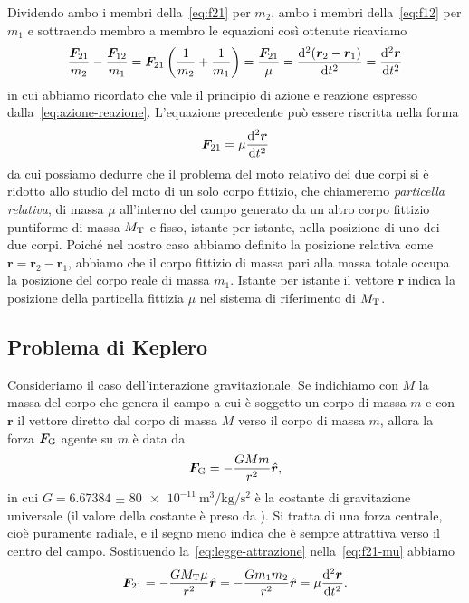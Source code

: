 Dividendo ambo i membri della~\eqref{eq:f21} per $m_2$, ambo i membri
della~\eqref{eq:f12} per $m_1$ e sottraendo membro a membro le equazioni così
ottenute ricaviamo
\begin{equation}
  \frac{\bm{F}_{21}}{m_2}-\frac{\bm{F}_{12}}{m_1} = \bm{F}_{21}
  \left(
    \frac{1}{m_2}+\frac{1}{m_1}
  \right) = \frac{\bm{F}_{21}}{\mu} = \toder[2]{(\bm{r}_2-\bm{r}_1)}{t} =
  \toder[2]{\bm{r}}{t}
\end{equation}
in cui abbiamo ricordato che vale il principio di azione e reazione espresso
dalla~\eqref{eq:azione-reazione}. L'equazione precedente può essere riscritta
nella forma
\begin{equation}
  \label{eq:f21-mu}
  \bm{F}_{21}=\mu\toder[2]{\bm{r}}{t}
\end{equation}
da cui possiamo dedurre che il problema del moto relativo dei due corpi si è
ridotto allo studio del moto di un solo corpo fittizio, che chiameremo
\emph{particella relativa}, di massa $\mu$ all'interno del campo generato da un
altro corpo fittizio puntiforme di massa $M_\textup{T}$ e fisso, istante per
istante, nella posizione di uno dei due corpi. Poiché nel nostro caso abbiamo
definito la posizione relativa come $\bm{r}=\bm{r}_2 - \bm{r}_1$, abbiamo che il
corpo fittizio di massa pari alla massa totale occupa la posizione del corpo
reale di massa $m_1$. Istante per istante il vettore $\bm{r}$ indica la
posizione della particella fittizia $\mu$ nel sistema di riferimento di
$M_\textup{T}$.

\subsection{Problema di Keplero}
\label{sec:problema-keplero}

Consideriamo il caso dell'interazione gravitazionale. Se indichiamo con $M$ la
massa del corpo che genera il campo a cui è soggetto un corpo di massa $m$ e con
$\bm{r}$ il vettore diretto dal corpo di massa $M$ verso il corpo di massa $m$,
allora la forza $\bm{F}_\textup{G}$ agente su $m$ è data da
\begin{equation}
  \label{eq:legge-attrazione}
  \bm{F}_\textup{G} = -\frac{GMm}{r^2}\versor{r},
\end{equation}
in cui $G=\SI{6.673 84(80)e-11}{\cubic\metre\per\kilogram\per\second\squared}$ è
la costante di gravitazione universale (il valore della costante è preso da
\textcite{codata:costanti}). Si tratta di una forza centrale, cioè puramente
radiale, e il segno meno indica che è sempre attrattiva verso il centro del
campo. Sostituendo la~\eqref{eq:legge-attrazione} nella~\eqref{eq:f21-mu}
abbiamo
\begin{equation}
  \label{eq:forza-mu}
  \bm{F}_{21} = -\frac{GM_\textup{T}\mu}{r^2}\versor{r} =
  -\frac{Gm_1m_2}{r^2}\versor{r} = \mu\toder[2]{\bm{r}}{t}.
\end{equation}

